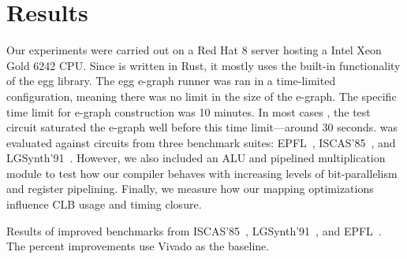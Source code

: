 \section{Results}\label{sec:results}
Our experiments were carried out on a Red Hat 8 server hosting a Intel Xeon
Gold 6242 CPU. Since \shortname{} is written in Rust, it mostly uses the
built-in functionality of the egg library. The egg e-graph runner was ran in a
time-limited configuration, meaning there was no limit in the size of the
e-graph. The specific time limit for e-graph construction was 10 minutes. In
most cases ,
the test circuit saturated the e-graph well before this time limit---around 30
seconds. \shortname{} was evaluated against circuits from three benchmark
suites: EPFL~\cite{epflbench}, ISCAS'85~\cite{iscasbench}, and
LGSynth'91~\cite{lgsynthbench}. However, we also included an ALU and pipelined
multiplication module to test how our compiler behaves with increasing levels
of bit-parallelism and register pipelining. Finally, we measure how our mapping
optimizations influence CLB usage and timing closure.

\begin{table}
    \centering
    \caption{Results of \nimproved{} improved benchmarks from ISCAS'85~\cite{iscasbench}, LGSynth'91~\cite{lgsynthbench}, and EPFL~\cite{epflbench}. The percent improvements use Vivado as the baseline.}\label{tab:results}
\end{table}

